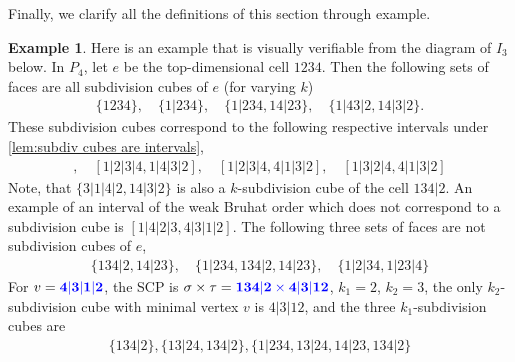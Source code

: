 \documentclass{amsart}
\newcommand{\blue}{\color{blue}} %
\theoremstyle{definition}
\newtheorem{example}[theorem]{Example}
\begin{document}
Finally, we clarify all the definitions of this section through example.

\begin{example}\label{ex:subdivision cubes}
Here is an example that is visually verifiable from the diagram of $I_3$ below.
In $P_4$, let $e$ be the top-dimensional cell $1234$. Then the following sets of faces are all subdivision cubes of $e$ (for varying $k$)
\begin{align*}
    \{1234\},\quad \{1|234\},\quad \{1|234, 14|23\},\quad \{1|43|2,14|3|2\}.
\end{align*}
These subdivision cubes correspond to the following respective intervals under  \cref{lem:subdiv cubes are intervals},
\begin{align*}
    [1|2|3|4,4|3|2|1],\quad [1|2|3|4,1|4|3|2],\quad [1|2|3|4,4|1|3|2],\quad [1|3|2|4, 4|1|3|2]
\end{align*}
Note, that $\{3|1|4|2,14|3|2\}$ is also a $k$-subdivision cube of the cell $134|2$.
An example of an interval of the weak Bruhat order which does not correspond to a subdivision cube is $[1|4|2|3,4|3|1|2]$.
The following three sets of faces are not subdivision cubes of $e$,
\begin{align*}
    \{134|2, 14|23\},\quad \{1|234, 134|2, 14|23\}, \quad \{1|2|34,1|23|4\}
\end{align*}
For $v = \blue{\mathbf{4|3|1|2}}$, the SCP is $\sigma\times \tau = \blue{\mathbf{134|2\times 4|3|12}}$, $k_1=2$, $k_2=3$, the only $k_2$-subdivision cube with minimal vertex $v$ is $4|3|12$, and the three $k_1$-subdivision cubes are
\begin{align*}
    \{134|2\}, \{13|24, 134|2\}, \{ 1|234, 13|24, 14|23, 134|2\}
\end{align*}


\end{example}
\end{document}
